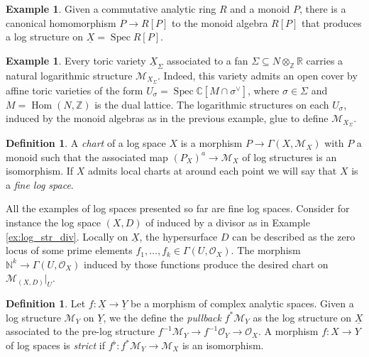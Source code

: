 \documentclass[reqno]{amsart}
\newcommand\N{\mathbb{N}}
\newcommand{\OO}{\mathcal{O}}
\DeclareMathOperator{\Spec}{Spec}
\newcommand{\M}{\mathcal{M}}
\DeclareMathOperator{\Hom}{Hom}
\theoremstyle{definition}
\newtheorem{definition}[theorem]{Definition}
\newtheorem{example}[theorem]{Example}
\theoremstyle{named}
\begin{document}
\begin{example}\label{ex: monoid_log_str}
Given a commutative analytic ring $R$ and a monoid $P$, there is a canonical homomorphism $P\rightarrow R[P]$ to the monoid algebra $R[P]$ that produces a log structure on $\underline{X}=\Spec R[P]$. 
\end{example}

\begin{example}\label{ex: toric_log_str}
Every toric variety $\underline{X}_\Sigma$ associated to a fan $\Sigma \subseteq N \otimes_{\mathbb{Z}} \mathbb{R}$ carries a natural logarithmic structure $\mathcal{M}_{X_\Sigma}$. Indeed, this variety admits an open cover by affine toric varieties of the form $U_\sigma = \Spec \mathbb{C}[M \cap \sigma^\vee]$, where $\sigma \in \Sigma$ and $M = \Hom(N,\mathbb{Z})$ is the dual lattice. The logarithmic structures on each $U_\sigma$, induced by the monoid algebras as in the previous example, glue to define $\mathcal{M}_{X_\Sigma}$.
\end{example}

\begin{definition}
A \textit{chart} of a log space $X$ is a morphism $P\rightarrow \Gamma(X,\M_X)$ with $P$ a monoid such that the associated map $(P_X)^a\rightarrow \M_X$ of log structures is an isomorphism. If $X$ admits local charts at around each point we will say that $X$ is a \textit{fine log space}.
\end{definition}

All the examples of log spaces presented so far are fine log spaces. Consider for instance the log space $(X,D)$ of induced by a divisor as in Example \ref{ex:log_str_div}. Locally on $\underline{X}$, the hypersurface $D$ can be described as the zero locus of some prime elements $f_1,\dots, f_k\in \Gamma(U,\OO_{X})$. The morphism $\N^k \rightarrow \Gamma(U,\OO_X)$ induced by those functions produce the desired chart on $\M_{(X,D)}|_U$.

\begin{definition}
Let $f: \underline{X}\rightarrow \underline{Y}$ be a morphism of complex analytic spaces. Given a log structure $\M_Y$ on $\underline{Y}$, we the define the \textit{pullback} $f^\ast\M_Y$ as the log structure on $\underline{X}$ associated to the pre-log structure $f^{-1}\M_Y\rightarrow f^{-1}\OO_Y\rightarrow \OO_X$. A morphism $f: X \rightarrow Y$ of log spaces is \textit{strict} if $f^{\flat}: f^\ast\M_Y\rightarrow\M_X$ is an isomorphism.
\end{definition}
\end{document}
